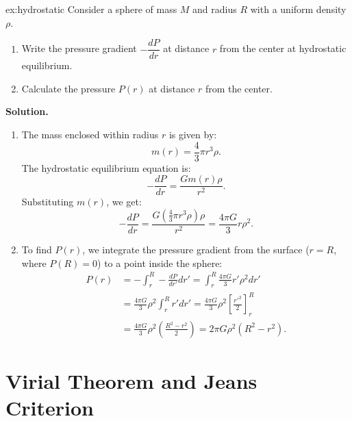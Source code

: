 \begin{example}{}{ex:hydrostatic}
Consider a sphere of mass $M$ and radius $R$ with a uniform density $\rho$.
    \begin{enumerate}[label=(\alph*)]
        \item Write the pressure gradient $-\dfrac{dP}{dr}$ at distance $r$ from the center at hydrostatic equilibrium.
        \item Calculate the pressure $P(r)$ at distance $r$ from the center.
    \end{enumerate}

\smallskip\textbf{Solution.}
\begin{enumerate}[label=(\alph*)]
    \item The mass enclosed within radius $r$ is given by:
    \begin{equation}
        m(r) = \frac{4}{3}\pi r^3 \rho.
    \end{equation}
    The hydrostatic equilibrium equation is:
    \begin{equation}
        -\frac{dP}{dr} = \frac{G m(r) \rho}{r^2}.
    \end{equation}
    Substituting $m(r)$, we get:
    \begin{equation}
        -\frac{dP}{dr} = \frac{G \left(\frac{4}{3}\pi r^3 \rho\right) \rho}{r^2} = \frac{4\pi G}{3} r \rho^2.
    \end{equation}
    
    \item To find $P(r)$, we integrate the pressure gradient from the surface ($r=R$, where $P(R)=0$) to a point inside the sphere:
    \begin{align*}
        P(r) &= -\int_r^R -\frac{dP}{dr'} dr' = \int_r^R \frac{4\pi G}{3} r' \rho^2 dr' \\
        &= \frac{4\pi G}{3} \rho^2 \int_r^R r' dr' = \frac{4\pi G}{3} \rho^2 \left[\frac{r'^2}{2}\right]_r^R \\
        &= \frac{4\pi G}{3} \rho^2 \left(\frac{R^2 - r^2}{2}\right) = 2\pi G \rho^2 (R^2 - r^2).
    \end{align*}
\end{enumerate}
\end{example}
\bigskip\noindent \bigskip\noindent \bigskip\noindent
\section{Virial Theorem and Jeans Criterion}
